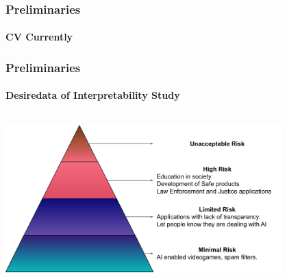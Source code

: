 \begin{frame}[t]
    \frametitle{Preliminaries}
    \framesubtitle{CV Currently}
    
    
\end{frame}
\begin{frame}[t]
    \frametitle{Preliminaries}
    \framesubtitle{Desiredata of Interpretability Study}
    \begin{columns}[c]
        \begin{center}
            \includegraphics[width=0.8\textwidth]{fig/rel/common/img/AI_act_pyramid.pdf}
        \end{center}
    \end{columns}
\end{frame}
